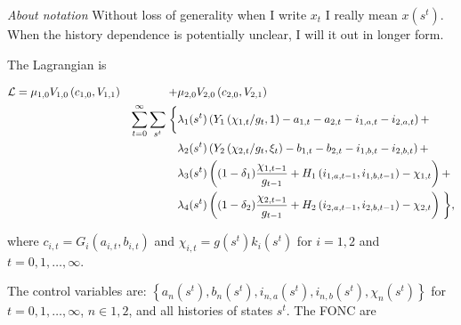 \documentclass[19pt]{article}
\begin{document}
\textit{About notation} Without loss of generality when I write $x_t$ I really mean $x(s^t)$. When the history dependence is potentially unclear, I will it out in longer form.

The Lagrangian is

\begin{alignat}{2} \label{eq:lagrangian}
  \mathcal{L} &= \mu_{1,0} V_{1,0}\left(c_{1,0}, V_{1,1}\right) &+& \mu_{2,0} V_{2,0}\left(c_{2,0}, V_{2,1} \right) \notag \\
  & & \sum_{t=0}^{\infty} \sum_{s^t}  \biggm \{
      &\lambda_{1}(s^t) \left( Y_1\left(\chi_{1,t}/g_t, 1\right) - a_{1,t} - a_{2,t} - i_{1,a,t} - i_{2,a,t} \right) + \notag \\
  & & &\lambda_{2}(s^t) \left( Y_2\left(\chi_{2,t}/g_t, \xi_t\right) - b_{1,t} - b_{2,t} - i_{1,b,t} - i_{2,b,t} \right) + \notag \\
  & & &\lambda_{3}(s^t) \left( (1-\delta_1)\frac{\chi_{1,t-1}}{g_{t-1}} + H_1 \left(i_{1,a,t-1}, i_{1,b,t-1} \right) - \chi_{1,t} \right) + \notag \\
  & & &\lambda_{4}(s^t) \left( (1-\delta_2)\frac{\chi_{2,t-1}}{g_{t-1}} + H_2 \left(i_{2,a,t-1}, i_{2,b,t-1} \right) - \chi_{2,t} \right)  \biggm\},
\end{alignat}

where $c_{i,t} = G_i(a_{i,t}, b_{i,t})$ and $\chi_{i,t} = g(s^t) k_i(s^t)$ for $i=1,2$ and $t=0, 1, \dots, \infty$.

The control variables are: $\left\{a_{n}(s^t), b_{n}(s^t), i_{n,a}(s^t), i_{n,b}(s^t), \chi_{n}(s^t) \right\}$ for $t=0,1,\dots, \infty$, $n \in {1,2}$, and all histories of states $s^t$. The FONC are
\end{document}
